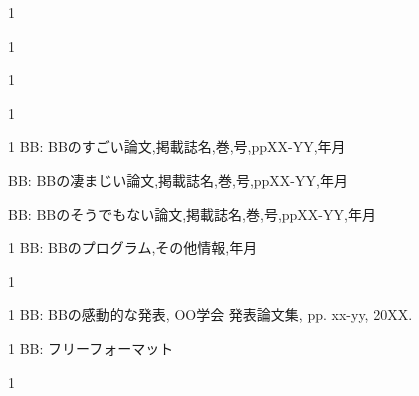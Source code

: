 \begin{招待講演}{1}

\end{招待講演}

\begin{招待論文}{1}

\end{招待論文}

\begin{受賞}{1}

\end{受賞}

\begin{著書}{1}
\end{著書}

\begin{査読付}{1}
BB:
BBのすごい論文,掲載誌名,巻,号,ppXX-YY,年月

BB:
BBの凄まじい論文,掲載誌名,巻,号,ppXX-YY,年月

BB:
BBのそうでもない論文,掲載誌名,巻,号,ppXX-YY,年月
\end{査読付}

\begin{公開}{1}
BB:
BBのプログラム,その他情報,年月
\end{公開}

\begin{特許}{1}

\end{特許}

\begin{発表}{1}
BB:
 BBの感動的な発表,  OO学会 発表論文集, pp. xx-yy, 20XX.
\end{発表}

\begin{特記}{1}
BB:
フリーフォーマット
\end{特記}

\begin{報道}{1}

\end{報道}
